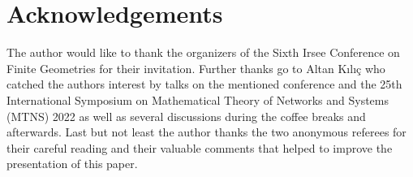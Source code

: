\documentclass[11pt]{article}
\begin{document}
\section*{Acknowledgements}
The author  would like to thank the organizers of the Sixth Irsee Conference on Finite Geometries for their invitation. 
Further thanks go to Altan K{\i}l{\i}{\c{c}} who catched the authors interest by talks on the mentioned conference and 
the 25th International Symposium on Mathematical Theory of Networks and Systems (MTNS) 2022 as well as several discussions 
during the coffee breaks and afterwards. Last but not least the author thanks the two anonymous referees for their careful 
reading and their valuable comments that helped to improve the presentation of this paper.   

\end{document}
